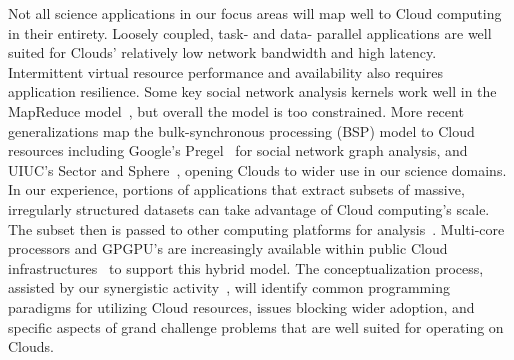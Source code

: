 Not all science applications in our focus areas will map well to Cloud computing in their entirety.
Loosely coupled, task- and data- parallel applications are well suited for Clouds' relatively low
network bandwidth and high latency. 
Intermittent virtual resource performance and availability
also requires application resilience. 
Some key social network analysis kernels work well in the
MapReduce model~\cite{conf/icdm/KangTF09}, but overall the model is too constrained. 
More recent generalizations map
the bulk-synchronous processing (BSP) model to Cloud resources including Google's Pregel~\cite{conf/spaa/MalewiczABDHLC09}
for social network graph analysis, and UIUC's Sector and Sphere~\cite{conf/spaa/MalewiczABDHLC09,oai:arXiv.org:0808.3019}, 
opening Clouds to wider use in our science domains. 
In our experience, portions of applications that extract subsets of
massive, irregularly structured datasets can take advantage of Cloud computing's scale. 
The subset
then is passed to other computing platforms for analysis~\cite{Cloud.hybrid}. Multi-core processors and GPGPU's are
increasingly available within public Cloud
infrastructures~\cite{AmazonGPU} to support this hybrid model.
The conceptualization process, assisted by our synergistic activity~\cite{prasanna:cic:pillcrow}, will identify common
programming paradigms for utilizing Cloud resources, issues blocking wider adoption, and specific
aspects of grand challenge problems that are well suited for operating on Clouds.

